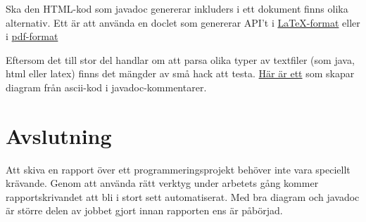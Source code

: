 \documentclass[11pt,a4paper]{article}
\begin{document}
    Ska den HTML-kod som javadoc genererar inkluders i ett dokument finns olika alternativ. Ett är att använda en doclet som genererar API't i \href{http://doclet.github.io/}{\LaTeX-format} eller i \href{http://sourceforge.net/projects/pdfdoclet/}{pdf-format}

    Eftersom det till stor del handlar om att parsa olika typer av textfiler (som java, html eller latex) finns det mängder av små hack att testa. \href{http://ditaa-addons.sourceforge.net/}{Här är ett} som skapar diagram från ascii-kod i javadoc-kommentarer.

    \section{Avslutning}

    Att skiva en rapport över ett programmeringsprojekt behöver inte vara speciellt krävande. Genom att använda rätt verktyg under arbetets gång kommer rapportskrivandet att bli i stort sett automatiserat. Med bra diagram och javadoc är större delen av jobbet gjort innan rapporten ens är påbörjad.


\end{document}
